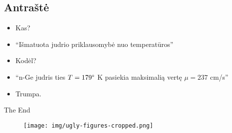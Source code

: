 \documentclass{beamer}
\makeatletter
\newcommand*{\currentname}{\@currentlabelname}
\makeatother
\begin{document}
\subsection{Antraštė}
\frame{\tableofcontents[currentsection, subsectionstyle=show/shaded/hide]}

\begin{frame}{\currentname}
  \begin{itemize}[<+->]
    \item<1-> Kas?
    \item<3-> ``Išmatuota judrio priklausomybė nuo temperatūros''
    \item<2-> Kodėl?
    \item<4-> ``n-Ge judris ties $T=179\degree$ K pasiekia maksimalią vertę $\mu=237$ cm/s''
    \item<5-> Trumpa.
  \end{itemize}
\end{frame}

\frame{\tableofcontents[sections={3}]}

\begin{frame}[plain,c]
\begin{center}
\Huge The End
\end{center}
\end{frame}

\begin{frame}
  \begin{figure}
    \begin{center} 
      \texttt{[image: img/ugly-figures-cropped.png]}
    \end{center}
  \end{figure}
\end{frame}
\end{document}
